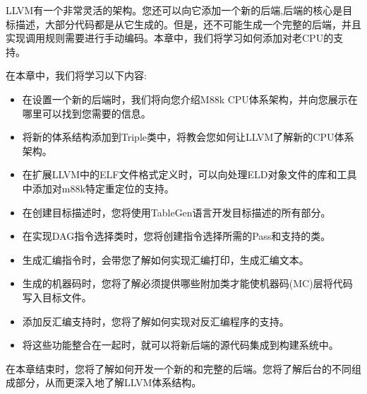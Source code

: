LLVM有一个非常灵活的架构。您还可以向它添加一个新的后端,后端的核心是目标描述，大部分代码都是从它生成的。但是，还不可能生成一个完整的后端，并且实现调用规则需要进行手动编码。本章中，我们将学习如何添加对老CPU的支持。\par

在本章中，我们将学习以下内容:\par

\begin{itemize}
\item 在设置一个新的后端时，我们将向您介绍M88k CPU体系架构，并向您展示在哪里可以找到您需要的信息。

\item 将新的体系结构添加到Triple类中，将教会您如何让LLVM了解新的CPU体系架构。

\item 在扩展LLVM中的ELF文件格式定义时，可以向处理ELD对象文件的库和工具中添加对m88k特定重定位的支持。

\item 在创建目标描述时，您将使用TableGen语言开发目标描述的所有部分。

\item 在实现DAG指令选择类时，您将创建指令选择所需的Pass和支持的类。

\item 生成汇编指令时，会带您了解如何实现汇编打印，生成汇编文本。

\item 生成的机器码时，您将了解必须提供哪些附加类才能使机器码(MC)层将代码写入目标文件。

\item 添加反汇编支持时，您将了解如何实现对反汇编程序的支持。

\item 将这些功能整合在一起时，就可以将新后端的源代码集成到构建系统中。
\end{itemize}

在本章结束时，您将了解如何开发一个新的和完整的后端。您将了解后台的不同组成部分，从而更深入地了解LLVM体系结构。\par



















